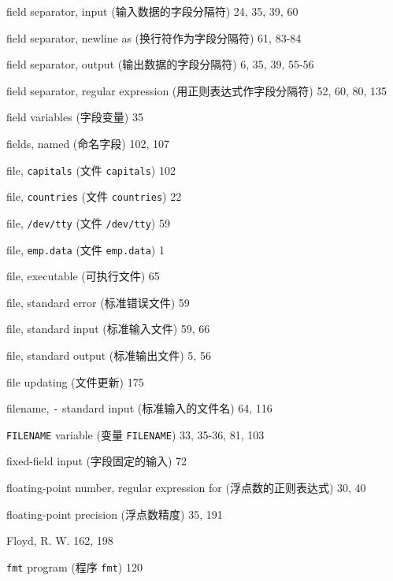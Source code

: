 \begin{multicols}{2}
\hangindent=2pc  field separator, input (输入数据的字段分隔符)
24, 35, 39, 60

\hangindent=2pc  field separator, newline as
(换行符作为字段分隔符) 61, 83-84

\hangindent=2pc  field separator, output (输出数据的字段分隔符)
6, 35, 39, 55-56

\hangindent=2pc  field separator, regular expression
(用正则表达式作字段分隔符) 52, 60, 80, 135

\hangindent=2pc  field variables (字段变量) 35

\hangindent=2pc  fields, named (命名字段) 102, 107

\hangindent=2pc  file, \verb'capitals' (文件 \verb'capitals') 102

\hangindent=2pc  file, \verb'countries' (文件 \verb'countries') 22

\hangindent=2pc  file, \verb'/dev/tty' (文件 \verb'/dev/tty') 59

\hangindent=2pc  file, \verb'emp.data' (文件 \verb'emp.data') 1

\hangindent=2pc  file, executable (可执行文件) 65

\hangindent=2pc  file, standard error (标准错误文件) 59

\hangindent=2pc  file, standard input (标准输入文件) 59, 66

\hangindent=2pc  file, standard output (标准输出文件) 5, 56

\hangindent=2pc  file updating (文件更新) 175

\hangindent=2pc  filename, \verb'-' standard input
(标准输入的文件名) 64, 116

\hangindent=2pc  \verb'FILENAME' variable (变量
\verb'FILENAME') 33, 35-36, 81, 103

\hangindent=2pc  fixed-field input (字段固定的输入) 72

\hangindent=2pc  floating-point number, regular expression for
(浮点数的正则表达式) 30, 40

\hangindent=2pc  floating-point precision (浮点数精度) 35, 191

\hangindent=2pc  Floyd, R. W. 162, 198

\hangindent=2pc  \verb'fmt' program (程序 \verb'fmt') 120


\end{multicols}
